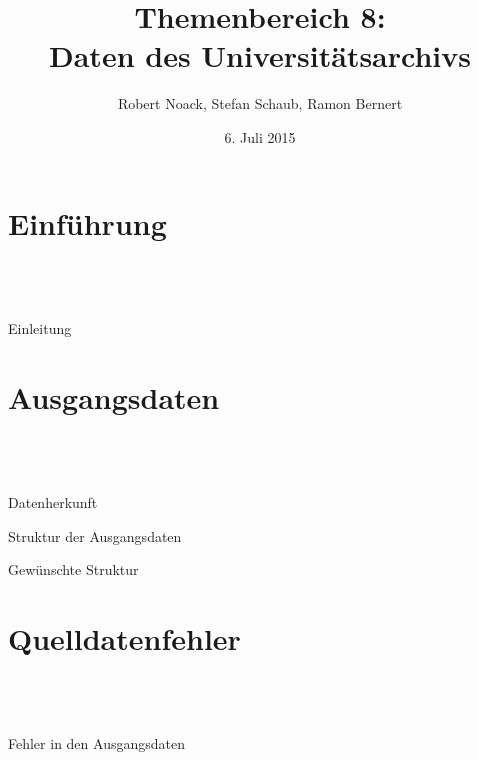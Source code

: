 \documentclass[12pt]{beamer}
\author{Robert Noack, Stefan Schaub, Ramon Bernert}
\title{Themenbereich 8: \\Daten des Universitätsarchivs}
\date{6. Juli 2015}
\begin{document}
\section*{}
\begin{frame}
\titlepage
\end{frame}

\begin{frame}
\tableofcontents
\end{frame}

\section{Einführung}
 \subsection*{~}
\begin{frame}{Einleitung}

\end{frame}

\begin{frame}

\end{frame}

\section{Ausgangsdaten}
 \subsection*{~}
\begin{frame}{Datenherkunft}

\end{frame}

\begin{frame}{Struktur der Ausgangsdaten}

\end{frame} 

\begin{frame}{Gewünschte Struktur}

\end{frame}


\section{Quelldatenfehler}
 \subsection*{~}
\begin{frame}{Fehler in den Ausgangsdaten}

\end{frame}
\end{document}
